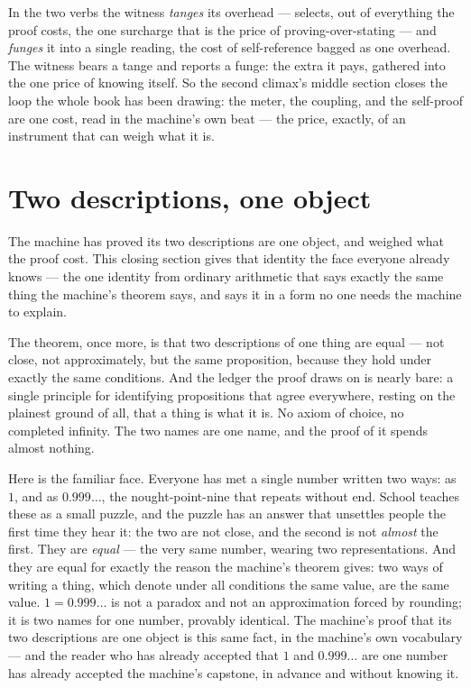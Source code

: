 In the two verbs the witness \emph{tanges} its overhead --- selects, out of everything the proof costs, the one
surcharge that is the price of proving-over-stating --- and \emph{funges} it into a single reading, the cost of
self-reference bagged as one overhead. The witness bears a tange and reports a funge: the extra it pays, gathered into
the one price of knowing itself. So the second climax's middle section closes the loop the whole book has been drawing:
the meter, the coupling, and the self-proof are one cost, read in the machine's own beat --- the price, exactly, of an
instrument that can weigh what it is.

\section{Two descriptions, one object}

The machine has proved its two descriptions are one object, and weighed what the proof cost. This closing section gives
that identity the face everyone already knows --- the one identity from ordinary arithmetic that says exactly the same
thing the machine's theorem says, and says it in a form no one needs the machine to explain.

The theorem, once more, is that two descriptions of one thing are equal --- not close, not approximately, but the same
proposition, because they hold under exactly the same conditions. And the ledger the proof draws on is nearly bare: a
single principle for identifying propositions that agree everywhere, resting on the plainest ground of all, that a
thing is what it is. No axiom of choice, no completed infinity. The two names are one name, and the proof of it spends
almost nothing.

Here is the familiar face. Everyone has met a single number written two ways: as $1$, and as $0.999\ldots$, the
nought-point-nine that repeats without end. School teaches these as a small puzzle, and the puzzle has an answer that
unsettles people the first time they hear it: the two are not close, and the second is not \emph{almost} the first.
They are \emph{equal} --- the very same number, wearing two representations. And they are equal for exactly the reason
the machine's theorem gives: two ways of writing a thing, which denote under all conditions the same value, are the
same value. $1 = 0.999\ldots$ is not a paradox and not an approximation forced by rounding; it is two names for one
number, provably identical. The machine's proof that its two descriptions are one object is this same fact, in the
machine's own vocabulary --- and the reader who has already accepted that $1$ and $0.999\ldots$ are one number has
already accepted the machine's capstone, in advance and without knowing it.

